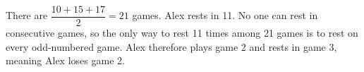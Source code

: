 There are $\dfrac{10+15+17}{2}=21$ games. Alex rests in 11. No one can rest in consecutive games, so the only way to rest 11 times among 21 games is to rest on every odd-numbered game. Alex therefore plays game 2 and rests in game 3, meaning $\boxed{\text{Alex}}$ loses game 2.
